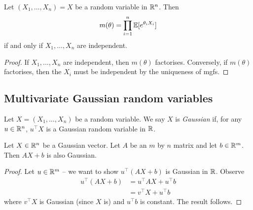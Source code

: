 \documentclass{../template/note}
\begin{document}
    \begin{proposition}
        Let \((X_1, \dots, X_n) =  X\) be a random variable in \(\mathbb R^n\). Then
        \begin{align*}
            m( \theta) = \prod_{i=1}^n \mathbb E[e^{\theta_i X_i}]
        \end{align*}
        if and only if \(X_1, \dots, X_n\) are independent.        
    \end{proposition}
    
    \begin{proof}
        If \(X_1, \dots, X_n\) are independent, then \(m(\theta)\) factorises. Conversely, if \(m(\theta)\) factorises, then the \(X_i\) must be independent by the uniqueness of mgfs.       
    \end{proof}
    
    \subsection{Multivariate Gaussian random variables}

    \begin{definition}
        Let \(X = (X_1, \dots, X_n)\) be a random variable. We say \(X\) is \emph{Gaussian} if, for any \(u \in \mathbb R^n\), \(u^\intercal X\) is a Gaussian random variable in \(\mathbb R\).
    \end{definition}
    
    \begin{proposition}
        \label{linear-preserves-gaussian}
        Let \(X \in \mathbb R^n\) be a Gaussian vector. Let \(A\) be an \(m\) by \(n\) matrix and let \(b \in \mathbb R^m\). Then \(AX + b\) is also Gaussian.
    \end{proposition}
    
    \begin{proof}
        Let \(u \in \mathbb R^m\) -- we want to show \(u^\intercal (AX + b)\) is Gaussian in \(\mathbb R\). Observe
        \begin{align*}
            u^\intercal(AX + b) &= u^\intercal AX + u^\intercal b \\
            &= v^\intercal X + u^\intercal b
        \end{align*}
        where \(v^\intercal X\) is Gaussian (since \(X\) is) and \(u^\intercal b\) is constant. The result follows.        
    \end{proof}
    
\end{document}
